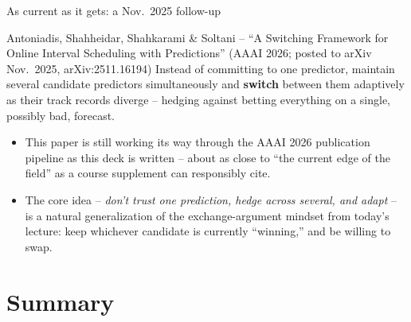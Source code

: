 \documentclass[11pt,aspectratio=169]{beamer}
\begin{document}
\begin{frame}{As current as it gets: a Nov.\ 2025 follow-up}
  \small
  \begin{block}{Antoniadis, Shahheidar, Shahkarami \& Soltani -- ``A Switching
  Framework for Online Interval Scheduling with Predictions'' (AAAI 2026; posted to
  arXiv Nov.\ 2025, arXiv:2511.16194)}
    Instead of committing to one predictor, maintain several candidate predictors
    simultaneously and \textbf{switch} between them adaptively as their track records
    diverge -- hedging against betting everything on a single, possibly bad, forecast.
  \end{block}
  \begin{itemize}
    \item This paper is still working its way through the AAAI 2026 publication
    pipeline as this deck is written -- about as close to ``the current edge of the
    field'' as a course supplement can responsibly cite.
    \item The core idea -- \emph{don't trust one prediction, hedge across several, and
    adapt} -- is a natural generalization of the exchange-argument mindset from today's
    lecture: keep whichever candidate is currently ``winning,'' and be willing to swap.
  \end{itemize}
\end{frame}

\section{Summary}
\end{document}
